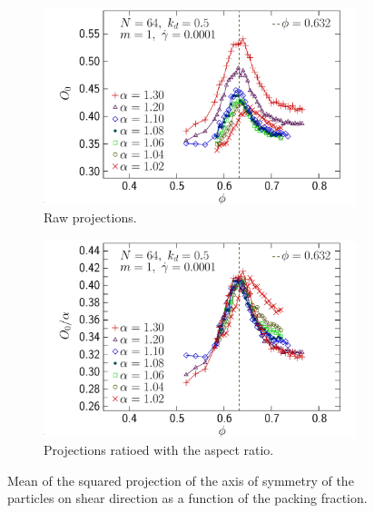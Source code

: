 \documentclass[class=report, float=false, crop=false]{standalone}
\begin{document}
\begin{figure}[h!]
\centering
    \begin{subfigure}[t]{0.49\textwidth}
        \centering
        \includegraphics[width=\textwidth]{figures/figs/ori0_phi_prolate_0064_KDk500_Ml100_GDh100}
        \caption{Raw projections.}
        \label{ori0_phi_prolate_0064_KDk500_Ml100_GDh100}
    \end{subfigure}
    \hfill
    \begin{subfigure}[t]{0.49\textwidth}
        \centering
        \includegraphics[width=\textwidth]{figures/figs/ori0al_phi_prolate_0064_KDk500_Ml100_GDh100}
        \caption{Projections ratioed with the aspect ratio.}
        \label{ori0al_phi_prolate_0064_KDk500_Ml100_GDh100}
    \end{subfigure}
    \caption{Mean of the squared projection of the axis of symmetry of the particles on shear direction as a function of the packing fraction.}
    \label{ori_phi_0064}
\end{figure}
\end{document}
